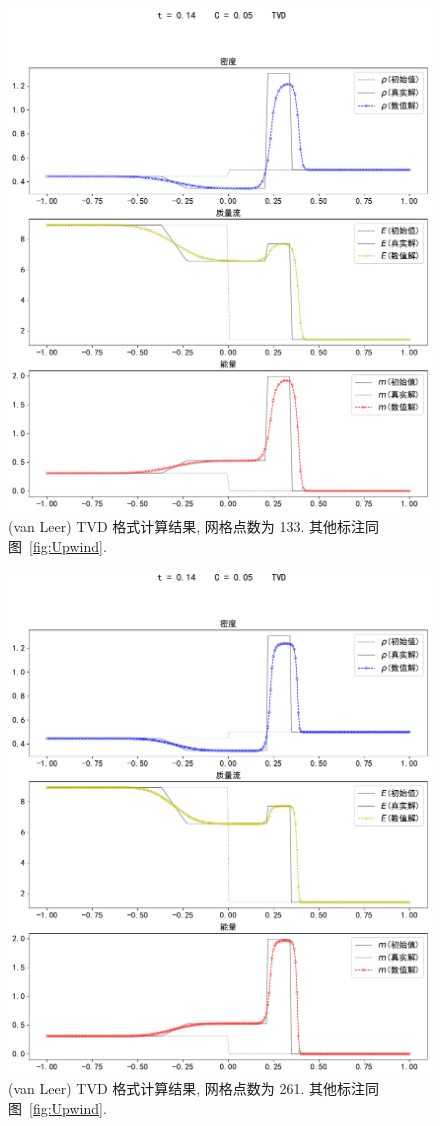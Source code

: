 \documentclass[10.5pt
]{article}
\begin{document}
\begin{figure}
\begin{center}
\includegraphics[width=.85\textwidth]{figures/limiter133.pdf}
\caption{(van Leer) TVD 格式计算结果, 网格点数为 133. 其他标注同图~\ref{fig:Upwind}.}\label{fig:vanLeerA}
\end{center}
\end{figure}

\begin{figure}
\begin{center}
\includegraphics[width=.85\textwidth]{figures/limiter261.pdf}
\caption{(van Leer) TVD 格式计算结果, 网格点数为 261. 其他标注同图~\ref{fig:Upwind}.}\label{fig:vanLeerB}
\end{center}
\end{figure}
\end{document}
